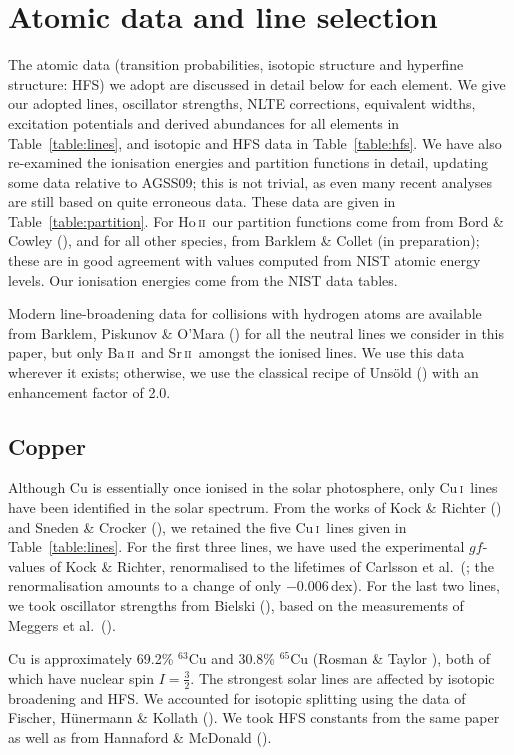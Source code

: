 \documentclass[traditabstract]{aa}
\newcommand{\altcui}{Cu\,\textsc{i}}
\newcommand{\altsrii}{Sr\,\textsc{ii}}
\newcommand{\altbaii}{Ba\,\textsc{ii}}
\newcommand{\althoii}{Ho\,\textsc{ii}}
\newcommand{\cui}{\altcui\ }
\newcommand{\srii}{\altsrii\ }
\newcommand{\baii}{\altbaii\ }
\newcommand{\hoii}{\althoii\ }
\begin{document}
\section{Atomic data and line selection}
\label{atomicdata}

The atomic data (transition probabilities, isotopic structure and hyperfine structure: HFS) we adopt are discussed in detail below for each element.  We give our adopted lines, oscillator strengths, NLTE corrections, equivalent widths, excitation potentials and derived abundances for all elements in Table~\ref{table:lines}, and isotopic and HFS data in Table~\ref{table:hfs}.  We have also re-examined the ionisation energies and partition functions in detail, updating some data relative to AGSS09; this is not trivial, as even many recent analyses are still based on quite erroneous data.  These data are given in Table~\ref{table:partition}.  For \hoii our partition functions come from from Bord \& Cowley (\cite{bord1}), and for all other species, from Barklem \& Collet (in preparation); these are in good agreement with values computed from NIST atomic energy levels.  Our ionisation energies come from the NIST data tables.

Modern line-broadening data for collisions with hydrogen atoms are available from Barklem, Piskunov \& O'Mara (\cite{bark}) for all the neutral lines we consider in this paper, but only \baii and \srii amongst the ionised lines.  We use this data wherever it exists; otherwise, we use the classical recipe of Uns\"old (\cite{unsold}) with an enhancement factor of 2.0.

\subsection{Copper}
Although Cu is essentially once ionised in the solar photosphere, only \cui lines have been identified in the solar spectrum. From the works of Kock \& Richter (\cite{kock}) and Sneden \& Crocker (\cite{sned2}), we retained the five \cui lines given in Table~\ref{table:lines}. For the first three lines, we have used the experimental $gf$-values of Kock \& Richter, renormalised to the lifetimes of Carlsson et al.\ (\cite{carl}; the renormalisation amounts to a change of only $-0.006$\,dex).  For the last two lines, we took oscillator strengths from Bielski (\cite{biel}), based on the measurements of Meggers et al.\ (\cite{Meggers61}). 

Cu is approximately 69.2\% $^{63}$Cu and 30.8\% $^{65}$Cu (Rosman \& Taylor \cite{IUPAC98}), both of which have nuclear spin $I=\frac32$.  The strongest solar lines are affected by isotopic broadening and HFS.  We accounted for isotopic splitting using the data of Fischer, H\"{u}nermann \& Kollath (\cite{fisch}).  We took HFS constants from the same paper as well as from Hannaford \& McDonald (\cite{hann}).
\end{document}
